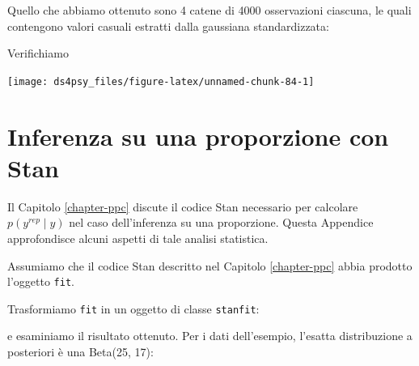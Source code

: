 \documentclass[
  11pt,
]{krantz}
\makeatletter
\newenvironment{Shaded}{\begin{snugshade}}{\end{snugshade}}
\newcommand{\DecValTok}[1]{\textcolor[rgb]{0.06,0.06,0.06}{#1}}
\newcommand{\FunctionTok}[1]{\textcolor[rgb]{0,0,0}{#1}}
\newcommand{\NormalTok}[1]{#1}
\newcommand{\OtherTok}[1]{\textcolor[rgb]{0.37,0.37,0.37}{#1}}
\newcommand{\SpecialCharTok}[1]{\textcolor[rgb]{0,0,0}{#1}}
\newenvironment{kframe}{%
\medskip{}
\setlength{\fboxsep}{.8em}
 \def\at@end@of@kframe{}%
 \ifinner\ifhmode%
  \def\at@end@of@kframe{\end{minipage}}%
  \begin{minipage}{\columnwidth}%
 \fi\fi%
 \def\FrameCommand##1{\hskip\@totalleftmargin \hskip-\fboxsep
 \colorbox{shadecolor}{##1}\hskip-\fboxsep
     \hskip-\linewidth \hskip-\@totalleftmargin \hskip\columnwidth}%
 \MakeFramed {\advance\hsize-\width
   \@totalleftmargin\z@ \linewidth\hsize
   \@setminipage}}%
 {\par\unskip\endMakeFramed%
 \at@end@of@kframe}
\renewenvironment{Shaded}{\begin{kframe}}{\end{kframe}}
\theoremstyle{definition}
\theoremstyle{definition}
\theoremstyle{definition}
\theoremstyle{definition}
\theoremstyle{remark}
\makeatother
\begin{document}
Quello che abbiamo ottenuto sono 4 catene di 4000 osservazioni ciascuna, le quali contengono valori casuali estratti dalla gaussiana standardizzata:

\begin{Shaded}
\end{Shaded}

Verifichiamo

\begin{Shaded}
\end{Shaded}

\begin{center}\texttt{[image: ds4psy\_files/figure-latex/unnamed-chunk-84-1]} \end{center}

\hypertarget{inference-one-prop}{%
\chapter{Inferenza su una proporzione con Stan}\label{inference-one-prop}}

Il Capitolo \ref{chapter-ppc} discute il codice Stan necessario per calcolare \(p(y^{rep} \mid y)\) nel caso dell'inferenza su una proporzione. Questa Appendice approfondisce alcuni aspetti di tale analisi statistica.

Assumiamo che il codice Stan descritto nel Capitolo \ref{chapter-ppc} abbia prodotto l'oggetto \texttt{fit}.

Trasformiamo \texttt{fit} in un oggetto di classe \texttt{stanfit}:

\begin{Shaded}
\end{Shaded}

e esaminiamo il risultato ottenuto. Per i dati dell'esempio, l'esatta distribuzione a posteriori è una Beta(25, 17):
\end{document}
